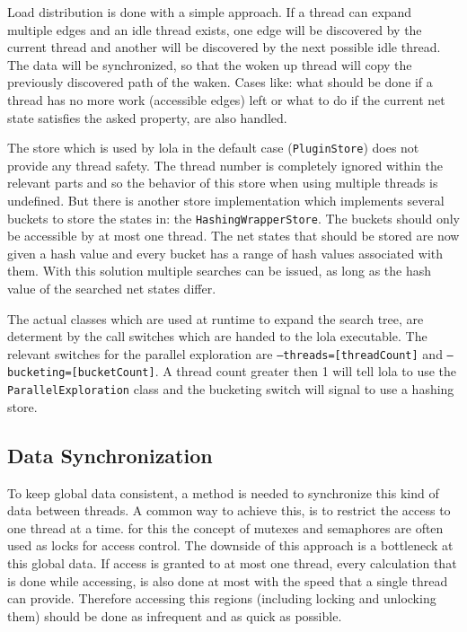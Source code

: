 Load distribution is done with a simple approach. If a thread can expand multiple edges and an idle thread exists, one edge will be discovered by the current thread and another will be discovered by the next possible idle thread. The data will be synchronized, so that the woken up thread will copy the previously discovered path of the waken. Cases like: what should be done if a thread has no more work (accessible edges) left or what to do if the current net state satisfies the asked property, are also handled.

The store which is used by lola in the default case (\texttt{PluginStore}) does not provide any thread safety. The thread number is completely ignored within the relevant parts and so the behavior of this store when using multiple threads is undefined. But there is another store implementation which implements several buckets to store the states in: the \texttt{HashingWrapperStore}. The buckets should only be accessible by at most one thread. The net states that should be stored are now given a hash value and every bucket has a range of hash values associated with them. With this solution multiple searches can be issued, as long as the hash value of the searched net states differ.

The actual classes which are used at runtime to expand the search tree, are determent by the call switches which are handed to the lola executable. The relevant switches for the parallel exploration are \texttt{--threads=[threadCount]} and \texttt{--bucketing=[bucketCount]}. A thread count greater then 1 will tell lola to use the \texttt{ParallelExploration} class and the bucketing switch will signal to use a hashing store.

\subsection{Data Synchronization}
To keep global data consistent, a method is needed to synchronize this kind of data between threads. A common way to achieve this, is to restrict the access to one thread at a time. for this the concept of mutexes and semaphores are often used as locks for access control. The downside of this approach is a bottleneck at this global data. If access is granted to at most one thread, every calculation that is done while accessing, is also done at most with the speed that a single thread can provide. Therefore accessing this regions (including locking and unlocking them) should be done as infrequent and as quick as possible.

